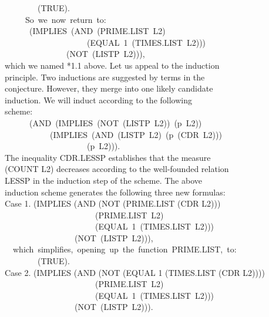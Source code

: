 \documentclass[10pt]{book}
\newenvironment{pubasis}{\begin{flushleft}}{\end{flushleft}}
\begin{document}
\begin{pubasis}
~~~~~~~~(TRUE).\\

~~~~~So~we~now~return~to:\\

~~~~~~(IMPLIES~(AND~(PRIME.LIST~L2)\\
~~~~~~~~~~~~~~~~~~~~(EQUAL~1~(TIMES.LIST~L2)))\\
~~~~~~~~~~~~~~~(NOT~(LISTP~L2))),\\

which we named *1.1 above.  Let us appeal to the induction\\
principle.  Two inductions are suggested by terms in the\\
conjecture.  However, they merge into one likely candidate\\
induction.  We will induct according to the following\\
scheme:\\
~~~~~~(AND~(IMPLIES~(NOT~(LISTP~L2))~(p~L2))\\
~~~~~~~~~~~(IMPLIES~(AND~(LISTP~L2)~(p~(CDR~L2)))\\
~~~~~~~~~~~~~~~~~~~~(p~L2))).\\
The inequality CDR.LESSP establishes that the measure\\
(COUNT L2) decreases according to the well-founded relation\\
LESSP in the induction step of the scheme.  The above\\
induction scheme generates the following three new formulas:\\

Case 1.	(IMPLIES (AND (NOT (PRIME.LIST (CDR L2)))\\
~~~~~~~~~~~~~~~~~~~~~~(PRIME.LIST~L2)\\
~~~~~~~~~~~~~~~~~~~~~~(EQUAL~1~(TIMES.LIST~L2)))\\
~~~~~~~~~~~~~~~~~(NOT~(LISTP~L2))),\\

~~which~simplifies,~opening~up~the~function~PRIME.LIST,~to:\\

~~~~~~~~(TRUE).\\

Case 2.	(IMPLIES (AND (NOT (EQUAL 1 (TIMES.LIST (CDR L2))))\\
~~~~~~~~~~~~~~~~~~~~~~(PRIME.LIST~L2)\\
~~~~~~~~~~~~~~~~~~~~~~(EQUAL~1~(TIMES.LIST~L2)))\\
~~~~~~~~~~~~~~~~~(NOT~(LISTP~L2))).\\


\end{pubasis}
\end{document}
